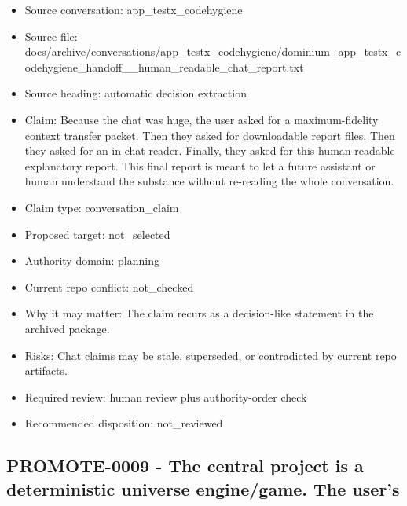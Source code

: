 \documentclass[11pt,a4paper]{report}
\begin{document}
\begin{itemize}
\item Source conversation: app\_testx\_codehygiene
\item Source file: docs/archive/conversations/app\_testx\_codehygiene/dominium\_app\_testx\_codehygiene\_handoff\_\_human\_readable\_chat\_report.txt
\item Source heading: automatic decision extraction
\item Claim: Because the chat was huge, the user asked for a maximum-fidelity context transfer packet. Then they asked for downloadable report files. Then they asked for an in-chat reader. Finally, they asked for this human-readable explanatory report. This final report is meant to let a future assistant or human understand the substance without re-reading the whole conversation.
\item Claim type: conversation\_claim
\item Proposed target: not\_selected
\item Authority domain: planning
\item Current repo conflict: not\_checked
\item Why it may matter: The claim recurs as a decision-like statement in the archived package.
\item Risks: Chat claims may be stale, superseded, or contradicted by current repo artifacts.
\item Required review: human review plus authority-order check
\item Recommended disposition: not\_reviewed
\end{itemize}

\subsection{PROMOTE-0009 - The central project is a deterministic universe engine/game. The user's}
\end{document}
